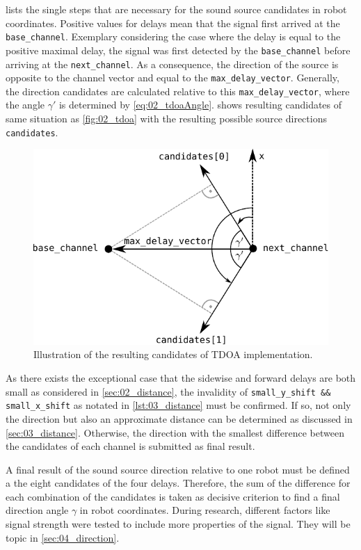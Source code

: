  lists the single steps that are necessary for the sound source
candidates in robot coordinates.
Positive values for delays mean that the signal first arrived at the \lstinline!base_channel!.
Exemplary considering the case where the delay is equal to the positive maximal delay,
the signal was first
detected by the \lstinline!base_channel! before arriving at the \lstinline!next_channel!.
As a consequence, the direction of the source is opposite to the channel vector and equal
to the \lstinline!max_delay_vector!.
Generally, the direction candidates are calculated relative to this \lstinline!max_delay_vector!,
where the angle $\gamma'$ is determined by \cref{eq:02_tdoaAngle}.
 shows resulting candidates of same situation as \cref{fig:02_tdoa} with
the resulting possible source directions \lstinline!candidates!.
\begin{figure}[ht]
	\centering
		\includegraphics[width=0.6\columnwidth]{figures/tdoa_code}
	\caption{Illustration of the resulting candidates of \ac{TDOA} implementation.}
	\label{fig:03_tdoaCode}
\end{figure}

As there exists the exceptional case that the sidewise and forward delays are both small
as considered in \cref{sec:02_distance}, the invalidity of
\lstinline!small_y_shift && small_x_shift! as notated in \cref{lst:03_distance} must
be confirmed.
If so, not only the direction but also an approximate distance can be determined
as discussed in \cref{sec:03_distance}.
Otherwise, the direction with the smallest difference between the
candidates of each channel is submitted as final result.

A final result of the sound source direction relative to one robot must be defined
a the eight candidates of the four delays.
Therefore, the sum of the difference for each combination of the candidates
is taken as decisive criterion to find a final direction angle $\gamma$ in robot coordinates.
During research, different factors like signal strength were tested to include
more properties of the signal. They will be topic in \ref{sec:04_direction}.